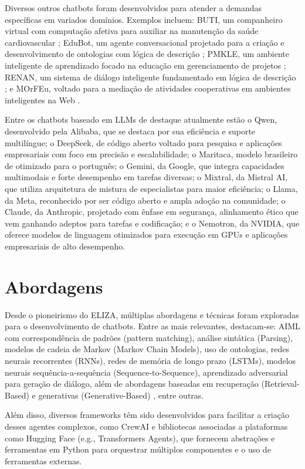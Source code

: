 \documentclass[14pt,a4paper,oneside]{book}
\begin{document}
Diversos outros chatbots foram desenvolvidos para atender a demandas específicas em variados domínios. Exemplos incluem: BUTI, um companheiro virtual com computação afetiva para auxiliar na manutenção da saúde cardiovascular \cite{Junior2008}; EduBot, um agente conversacional projetado para a criação e desenvolvimento de ontologias com lógica de descrição \cite{Lima2017}; PMKLE, um ambiente inteligente de aprendizado focado na educação em gerenciamento de projetos \cite{Torreao2005}; RENAN, um sistema de diálogo inteligente fundamentado em lógica de descrição \cite{AZEVEDO2015}; e MOrFEu, voltado para a mediação de atividades cooperativas em ambientes inteligentes na Web \cite{Bada2012}.

Entre os chatbots baseado em LLMs de destaque atualmente estão o Qwen, desenvolvido pela Alibaba, que se destaca por sua eficiência e suporte multilíngue; o DeepSeek, de código aberto voltado para pesquisa e aplicações empresariais com foco em precisão e escalabilidade; o Maritaca, modelo brasileiro de otimizado para o português; o Gemini, da Google, que integra capacidades multimodais e forte desempenho em tarefas diversas; o Mixtral, da Mistral AI, que utiliza arquitetura de mistura de especialistas para maior eficiência; o Llama, da Meta, reconhecido por ser código aberto e ampla adoção na comunidade; o Claude, da Anthropic, projetado com ênfase em segurança, alinhamento ético que vem ganhando adeptos para tarefas e codificação; e o Nemotron, da NVIDIA, que oferece modelos de linguagem otimizados para execução em GPUs e aplicações empresariais de alto desempenho. 

\section{Abordagens}

Desde o pioneirismo do ELIZA, múltiplas abordagens e técnicas foram exploradas para o desenvolvimento de chatbots. 
Entre as mais relevantes, destacam-se: AIML com correspondência de padrões (pattern matching), análise sintática (Parsing), modelos de cadeia de Markov (Markov Chain Models), uso de ontologias, redes neurais recorrentes (RNNs), redes de memória de longo prazo (LSTMs), modelos neurais sequência-a-sequência (Sequence-to-Sequence), aprendizado adversarial para geração de diálogo, além de abordagens baseadas em recuperação (Retrieval-Based) e generativas (Generative-Based) \cite{Borah2019, Ramesh2019, Shaikh2016, Abdul-Kader2015, Li2018}, entre outras.

Além disso, diversos frameworks têm sido desenvolvidos para facilitar a criação desses agentes complexos, como CrewAI e bibliotecas associadas a plataformas como Hugging Face (e.g., Transformers Agents), que fornecem abstrações e ferramentas em Python para orquestrar múltiplos componentes e o uso de ferramentas externas.
\end{document}
